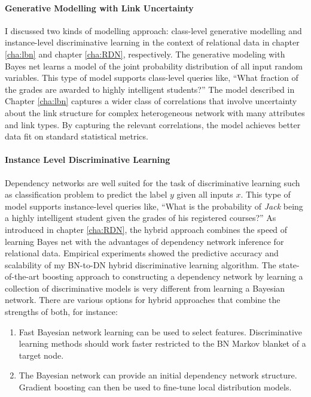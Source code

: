 \documentclass{sfuthesis}
\begin{document}
\paragraph{Generative Modelling with Link Uncertainty}  
I discussed two kinds of modelling approach: class-level generative modelling and instance-level discriminative learning in the context of relational data in chapter \ref{cha:lbn} and chapter \ref{cha:RDN}, respectively.  The generative modeling with Bayes net learns a model of the joint probability distribution of all input random variables. 
This type of model supports class-level queries like, ``What fraction of the grades are awarded to highly intelligent students?''
The model described in Chapter \ref{cha:lbn} captures a wider class of correlations that involve uncertainty about the link structure for complex heterogeneous network with many attributes and link types.  By capturing the relevant correlations, the model achieves better data fit on standard statistical metrics.



\paragraph {Instance Level Discriminative Learning}%
Dependency networks are well suited for the task of discriminative learning such as classification problem to predict the label $y$ given all inputs $x$.
This type of model supports instance-level queries like, 
``What is the probability of {\em Jack} being a highly intelligent student given the grades of his registered courses?''
As introduced in chapter \ref{cha:RDN}, the hybrid approach combines the speed of learning Bayes net with the advantages of dependency network inference for relational data. Empirical experiments showed the predictive accuracy and scalability of my BN-to-DN hybrid discriminative learning algorithm. The state-of-the-art boosting approach to constructing a dependency network by learning a collection of discriminative models is very different from learning a Bayesian network. 
There are various options for hybrid approaches that combine the strengths of both, for instance:
\begin{enumerate}
\item Fast Bayesian network learning can be used to select features. Discriminative learning methods should work faster restricted to the BN Markov blanket of a target node. 
\item The Bayesian network can provide an initial dependency network structure. Gradient boosting can then be used to fine-tune local distribution models.
\end{enumerate}
\end{document}
